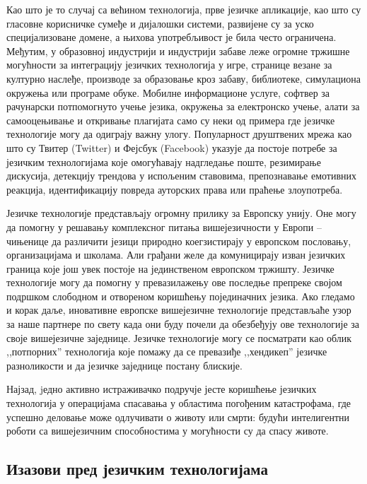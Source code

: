 \begin{multicols}{2}
Као што је то случај са већином технологија, прве језичке апликације, као што су гласовне корисничке сумеђе и дијалошки системи, развијене су за уско специјализоване домене, а њихова употребљивост је била често ограничена. Међутим, у образовној индустрији и индустрији забаве леже огромне тржишне могућности за интеграцију језичких технологија у игре, странице везане за културно наслеђе, производе за образовање кроз забаву, библиотеке, симулациона окружења или програме обуке. Мобилне информационе услуге, софтвер за рачунарски потпомогнуто учење језика, окружења за електронско учење, алати за самооцењивање и откривање плагијата само су неки од примера где језичке технологије могу да одиграју важну улогу. Популарност друштвених мрежа као што су Твитер (Twitter) и Фејсбук (Facebook) указује да постоје потребе за језичким технологијама које омогућавају надгледање поште, резимирање дискусија, детекцију трендова у испољеним ставовима, препознавање емотивних реакција, идентификацију повреда ауторских права или праћење злоупотреба.


Језичке технологије представљају огромну прилику за Европску унију. Оне могу да помогну у решавању комплексног питања вишејезичности у Европи -- чињенице да различити језици природно коегзистирају у европском пословању, организацијама и школама. Али грађани желе да комуницирају изван језичких граница које још увек постоје на јединственом европском тржишту. Језичке технологије могу да помогну у превазилажењу ове последње препреке својом подршком слободном и отвореном коришћењу појединачних језика. Ако гледамо и корак даље, иновативне европске вишејезичне технологије представљаће узор за наше партнере по свету када они буду почели да обезбеђују ове технологије за своје вишејезичне заједнице. Језичке технологије могу се посматрати као облик ,,потпорних'' технологија које помажу да се превазиђе ,,хендикеп'' језичке разноликости и да језичке заједнице постану блискије.

Најзад, jедно активно истраживачко подручје  јесте коришћење језичких технологија у операцијама спасавања у областима погођеним  катастрофама, где успешно деловање може одлучивати о животу или смрти: будући интелигентни роботи са вишејезичним способностима у могућности су да спасу животе. 


\subsection{Изазови пред језичким технологијама}
  

\end{multicols}
